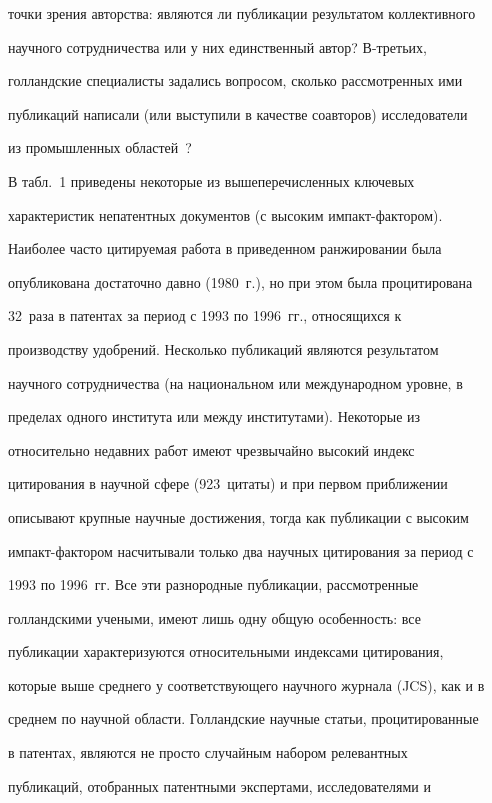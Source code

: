 точки зрения авторства: являются ли публикации результатом коллективного 


научного сотрудничества или у них единственный автор? В-третьих, 


голландские специалисты задались вопросом, сколько рассмотренных ими 


публикаций написали (или выступили в качестве соавторов) исследователи 


из промышленных областей~\cite{1-koz}? 


     


     В табл.~1 приведены некоторые из вышеперечисленных ключевых 


характеристик непатентных документов (с высоким импакт-фактором). 


Наиболее часто цитируемая работа в приведенном ранжировании была 


опубликована достаточно давно (1980~г.), но при этом была процитирована 


32~раза в патентах за период с 1993 по 1996~гг., относящихся к 


производству удобрений. Несколько публикаций являются результатом 


научного сотрудничества (на национальном или международном уровне, в 


пределах одного института или между институтами). Некоторые из 


относительно недавних работ имеют чрезвычайно высокий индекс 


цитирования в научной сфере (923~цитаты) и при первом приближении 


описывают крупные научные достижения, тогда как публикации с высоким 


импакт-фактором насчитывали только два научных цитирования за период с 


1993 по 1996~гг. Все эти разнородные публикации, рассмотренные 


голландскими учеными, имеют лишь одну общую особенность: все 


публикации характеризуются относительными индексами цитирования, 


которые выше среднего у соответствующего научного журнала (JCS), как и в 


среднем по научной области. Голландские научные статьи, процитированные 


в патентах, являются не просто случайным набором релевантных 


публикаций, отобранных патентными экспертами, исследователями и 


